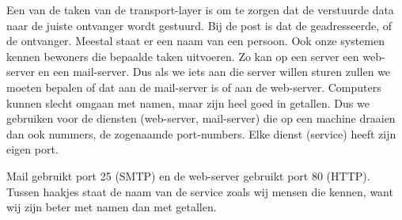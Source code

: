 Een van de taken van de transport-layer is om te zorgen dat de verstuurde data naar de juiste ontvanger wordt gestuurd. Bij de post is dat de geadresseerde, of de ontvanger. Meestal staat er een naam van een persoon. Ook onze systemen kennen bewoners die bepaalde taken uitvoeren. Zo kan op een server een web-server en een mail-server. Dus als we iets aan die server willen sturen zullen we moeten bepalen of dat aan de mail-server is of aan de web-server. Computers kunnen slecht omgaan met namen, maar zijn heel goed in getallen. Dus we gebruiken voor de diensten (web-server, mail-server) die op een machine draaien dan ook nummers, de zogenaamde port-numbers. Elke dienst (service) heeft zijn eigen port.

Mail gebruikt port 25 (SMTP) en de web-server gebruikt port 80 (HTTP). Tussen haakjes staat de naam van de service zoals wij mensen die kennen, want wij zijn beter met namen dan met getallen.

